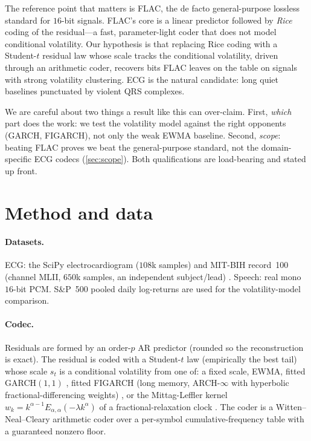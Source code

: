 \documentclass[11pt,reqno]{amsart}
\theoremstyle{plain}
\theoremstyle{remark}
\begin{document}
The reference point that matters is FLAC, the de facto general-purpose lossless
standard for $16$-bit signals. FLAC's core is a linear predictor followed by
\emph{Rice} coding of the residual---a fast, parameter-light coder that does not
model conditional volatility. Our hypothesis is that replacing Rice coding with
a Student-$t$ residual law whose scale tracks the conditional volatility, driven
through an arithmetic coder, recovers bits FLAC leaves on the table on signals
with strong volatility clustering. ECG is the natural candidate: long quiet
baselines punctuated by violent QRS complexes.

We are careful about two things a result like this can over-claim. First,
\emph{which} part does the work: we test the volatility model against the right
opponents (GARCH, FIGARCH), not only the weak EWMA baseline. Second,
\emph{scope}: beating FLAC proves we beat the general-purpose standard, not the
domain-specific ECG codecs (\cref{sec:scope}). Both qualifications are load-bearing
and stated up front.

\section{Method and data}
\label{sec:method}

\paragraph{Datasets.} ECG: the SciPy electrocardiogram ($108$k samples) and
MIT-BIH record~100 (channel MLII, $650$k samples, an independent
subject/lead) \cite{mitbih,physionet}. Speech: real mono $16$-bit PCM. S\&P~500
pooled daily log-returns are used for the volatility-model comparison.

\paragraph{Codec.} Residuals are formed by an order-$p$ AR predictor (rounded so
the reconstruction is exact). The residual is coded with a Student-$t$ law
(empirically the best tail) whose scale $s_t$ is a conditional volatility from
one of: a fixed scale, EWMA, fitted GARCH$(1,1)$ \cite{garch}, fitted FIGARCH
(long memory, ARCH-$\infty$ with hyperbolic fractional-differencing weights)
\cite{figarch}, or the Mittag-Leffler kernel $w_k=k^{\alpha-1}E_{\alpha,\alpha}
(-\lambda k^\alpha)$ of a fractional-relaxation clock \cite{mem,GKMR}. The coder
is a Witten--Neal--Cleary arithmetic coder \cite{wnc} over a per-symbol
cumulative-frequency table with a guaranteed nonzero floor.
\end{document}
